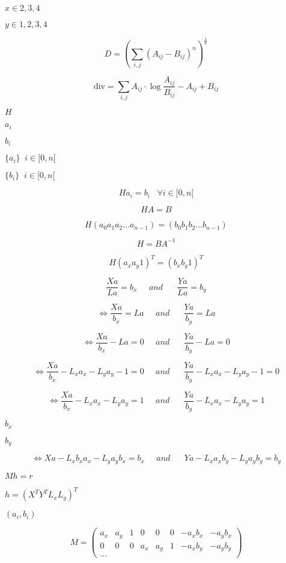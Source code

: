 \documentclass{article}
\begin{document}
$x \in {2,3,4}$
\pagebreak

$y \in {1,2,3,4}$
\pagebreak

\[ D = \left(\sum\limits_{i,j} (A_{ij}-B_{ij})^n\right)^{\frac{1}{n}} \]
\pagebreak

\[ \mbox{div} = \sum\limits_{i,j} A_{ij} \cdot \log{\frac{A_{ij}}{B_{ij}}} - A_{ij} + B_{ij} \]
\pagebreak

$H$
\pagebreak

$a_i$
\pagebreak

$b_i$
\pagebreak

$ \{a_i\} \;\;i \in [0,n[ $
\pagebreak

$ \{b_i\} \;\;i \in [0,n[ $
\pagebreak

\[ H a_i = b_i \;\;\; \forall i \in [0,n[ \]
\pagebreak

\[ H A = B \]
\pagebreak

\[ H (a_0 a_1 a_2 ... a_{n-1}) = (b_0 b_1 b_2 ... b_{n-1}) \]
\pagebreak

\[ H = B A^{-1} \]
\pagebreak

\[ H ( a_x a_y 1 )^T = (b_x b_y 1)^T \]
\pagebreak

\[ \frac{X a}{L a} = b_x \;\;\;\;\;and\;\;\;\;\;\; \frac{Y a}{L a} = b_y \]
\pagebreak

\[ \Leftrightarrow \frac{X a}{b_x} = La \;\;\;\;\;and\;\;\;\;\;\; \frac{Y a}{b_y} = La \]
\pagebreak

\[ \Leftrightarrow \frac{X a}{b_x} - La = 0 \;\;\;\;\;and\;\;\;\;\;\; \frac{Y a}{b_y} - La = 0 \]
\pagebreak

\[ \Leftrightarrow \frac{X a}{b_x} - L_x a_x - L_y a_y - 1 = 0 \;\;\;\;\;and\;\;\;\;\;\; \frac{Y a}{b_y} - L_x a_x - L_y a_y - 1 = 0 \]
\pagebreak

\[ \Leftrightarrow \frac{X a}{b_x} - L_x a_x - L_y a_y = 1 \;\;\;\;\;and\;\;\;\;\;\; \frac{Y a}{b_y} - L_x a_x - L_y a_y = 1 \]
\pagebreak

$ b_x $
\pagebreak

$ b_y $
\pagebreak

\[ \Leftrightarrow X a - L_x b_x a_x - L_y a_y b_x = b_x \;\;\;\;\;and\;\;\;\;\;\; Y a - L_x a_x b_y - L_y a_y b_y = b_y \]
\pagebreak

$ M h = r $
\pagebreak

$ h = (X^T Y^T L_x L_y)^T $
\pagebreak

$(a_i,b_i)$
\pagebreak

\[ M=\left(\begin{array}{cccccccc} a_x & a_y & 1 & 0 & 0 & 0 & -a_x b_x & -a_y b_x \\ 0 & 0 & 0 & a_x & a_y & 1 & -a_x b_y & -a_y b_y \\ ... \end{array}\right) \]
\pagebreak
\end{document}
